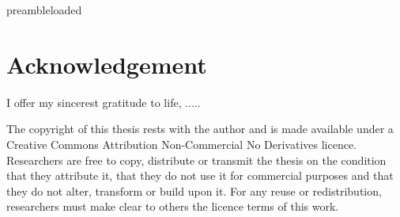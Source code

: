 \def\ifundefined#1{\expandafter\ifx\csname#1\endcsname\relax}
\ifundefined{preambleloaded}\else\typeout{\preambleloaded}\fi




\thispagestyle{empty} 

\maketitle


\thispagestyle{empty}

\newpage

\begin{abstract}

\end{abstract}


\chapter*{Acknowledgement}
I offer my sincerest gratitude to life, .....
\clearpage

\vspace*{\fill}
The copyright of this thesis rests with the author and is made available under a Creative Commons Attribution Non-Commercial No Derivatives licence. Researchers are free to copy, distribute or transmit the thesis on the condition that they attribute it, that they do not use it for commercial purposes and that they do not alter, transform or build upon it. For any reuse or redistribution, researchers must make clear to others the licence terms of this work.

\begin{center}
\end{center}


\newpage

\tableofcontents

\thispagestyle{empty}

\newpage







    




\newpage

\label{page_bibliography}
 








